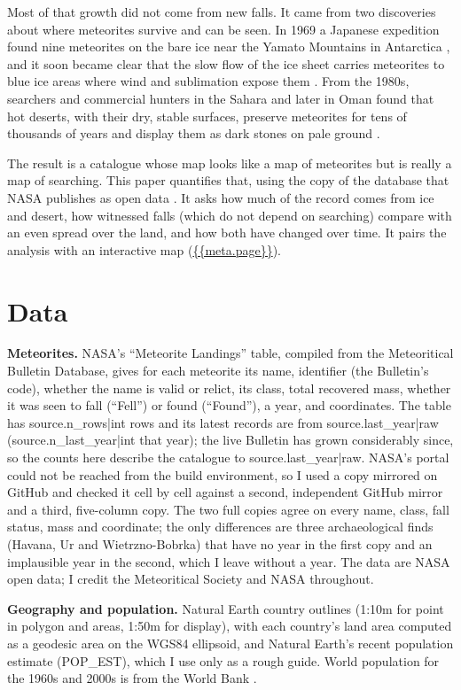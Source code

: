 \documentclass[11pt,a4paper]{article}
\begin{document}
Most of that growth did not come from new falls. It came from two discoveries about where meteorites survive and can be seen. In 1969 a Japanese expedition found nine meteorites on the bare ice near the Yamato Mountains in Antarctica \citep{yoshida}, and it soon became clear that the slow flow of the ice sheet carries meteorites to blue ice areas where wind and sublimation expose them \citep{harvey}. From the 1980s, searchers and commercial hunters in the Sahara and later in Oman found that hot deserts, with their dry, stable surfaces, preserve meteorites for tens of thousands of years and display them as dark stones on pale ground \citep{bland}.

The result is a catalogue whose map looks like a map of meteorites but is really a map of searching. This paper quantifies that, using the copy of the database that NASA publishes as open data \citep{nasa}. It asks how much of the record comes from ice and desert, how witnessed falls (which do not depend on searching) compare with an even spread over the land, and how both have changed over time. It pairs the analysis with an interactive map (\url{{{meta.page}}}).

\section{Data}
\textbf{Meteorites.} NASA's ``Meteorite Landings'' table, compiled from the Meteoritical Bulletin Database, gives for each meteorite its name, identifier (the Bulletin's code), whether the name is valid or relict, its class, total recovered mass, whether it was seen to fall (``Fell'') or found (``Found''), a year, and coordinates. The table has {{source.n_rows|int}} rows and its latest records are from {{source.last_year|raw}} ({{source.n_last_year|int}} that year); the live Bulletin has grown considerably since, so the counts here describe the catalogue to {{source.last_year|raw}}. NASA's portal could not be reached from the build environment, so I used a copy mirrored on GitHub and checked it cell by cell against a second, independent GitHub mirror and a third, five-column copy. The two full copies agree on every name, class, fall status, mass and coordinate; the only differences are three archaeological finds (Havana, Ur and Wietrzno-Bobrka) that have no year in the first copy and an implausible year in the second, which I leave without a year. The data are NASA open data; I credit the Meteoritical Society and NASA throughout.

\textbf{Geography and population.} Natural Earth \citep{naturalearth} country outlines (1:10m for point in polygon and areas, 1:50m for display), with each country's land area computed as a geodesic area on the WGS84 ellipsoid, and Natural Earth's recent population estimate (POP\_EST), which I use only as a rough guide. World population for the 1960s and 2000s is from the World Bank \citep{worldbank}.
\end{document}
